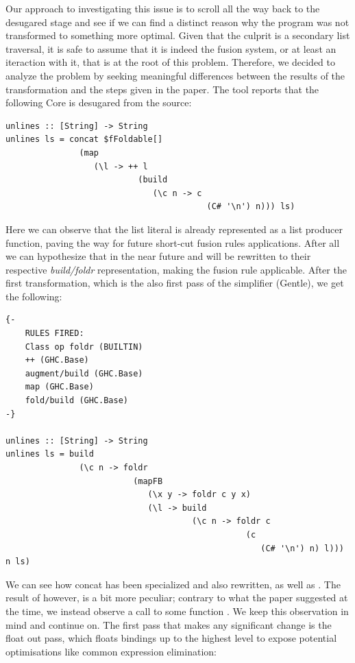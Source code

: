 Our approach to investigating this issue is to scroll all the way back to the desugared stage and see if we can find a distinct reason why the program was not transformed 
to something more optimal. Given that the culprit is a secondary list traversal, it is safe to assume that it is indeed the fusion system, or at least an iteraction with it,
that is at the root of this problem. Therefore, we decided to analyze the problem by seeking meaningful differences between the results of the transformation and the steps
given in the paper. The tool reports that the following Core is desugared from the source:

\begin{listing}[H]
\begin{verbatim}
unlines :: [String] -> String
unlines ls = concat $fFoldable[]
               (map
                  (\l -> ++ l
                           (build
                              (\c n -> c
                                         (C# '\n') n))) ls)
\end{verbatim}
\end{listing}

Here we can observe that the list literal \mono{['\n']} is already represented as a list producer function, paving the way for future short-cut fusion
rules applications. After all we can hypothesize that in the near future  and \mono{++} will be rewritten to their respective \textit{build/foldr} representation,
making the fusion rule applicable. After the first transformation, which is the also first pass of the simplifier (Gentle), we get the following:

\begin{listing}[H]
\begin{verbatim}
{-
    RULES FIRED:
    Class op foldr (BUILTIN)
    ++ (GHC.Base)
    augment/build (GHC.Base)
    map (GHC.Base)
    fold/build (GHC.Base)
-}

unlines :: [String] -> String
unlines ls = build
               (\c n -> foldr
                          (mapFB
                             (\x y -> foldr c y x)
                             (\l -> build
                                      (\c n -> foldr c
                                                 (c
                                                    (C# '\n') n) l))) n ls)
\end{verbatim}
\end{listing}

We can see how concat has been specialized and also rewritten, as well as \mono{++}. The result of  however, is a bit more peculiar; contrary to what the paper
suggested at the time, we instead observe a call to some function . We keep this observation in mind and continue on.
The first pass that makes any significant change is the float out pass, which floats bindings up to the highest level to expose potential optimisations like
common expression elimination:

